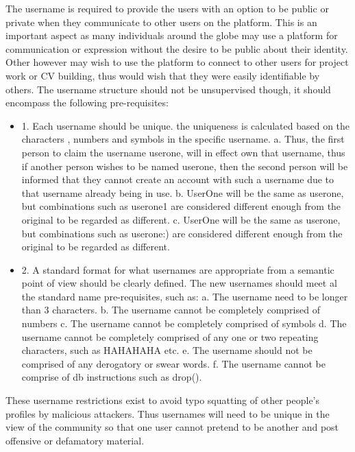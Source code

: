 \documentclass{article}
\begin{document}
The username is required to provide the users with an option to be public or private when they communicate to other users on the platform. This is an important aspect as many individuals around the globe may use a platform for communication or expression without the desire to be public about their identity. Other however may wish to use the platform to connect to other users for project work or CV building, thus would wish that they were easily identifiable by others.
The username structure should not be unsupervised though, it should encompass the following pre-requisites:
\begin{itemize}
\item1.	Each username should be unique. the  uniqueness is calculated based on the characters , numbers and symbols in the specific username. 
\subitem a.	Thus, the first person to claim the username userone, will in effect own that username, thus if another person wishes to be named userone, then the second person will be informed that they cannot create an account with such a username due to that username already being in use.
\subitem b.	UserOne will be the same as userone, but combinations such as userone1 are considered different enough from the original to be regarded as different.
\subitem c.	UserOne will be the same as userone, but combinations such as userone:) are considered different enough from the original to be regarded as different.
\item 2.	A standard format for what usernames are appropriate from a semantic point of view should be clearly defined. The new usernames should meet al the standard name pre-requisites, such as:
\subitem a.	The username need to be longer than 3 characters.
\subitem b.	 The username cannot be completely comprised of numbers
\subitem c.	The username cannot be completely comprised of symbols
\subitem d.	The username cannot be completely comprised of any one or two repeating characters, such as HAHAHAHA etc.
\subitem e.	The username should not be comprised of any derogatory or swear words.
\subitem f.	The username cannot be comprise of db instructions such as drop().
\end{itemize}
These username restrictions exist to avoid typo squatting of other people’s profiles by malicious attackers. Thus usernames will need to be unique in the view of the community so that one user cannot pretend to be another and post offensive or defamatory material. 
\end{document}
